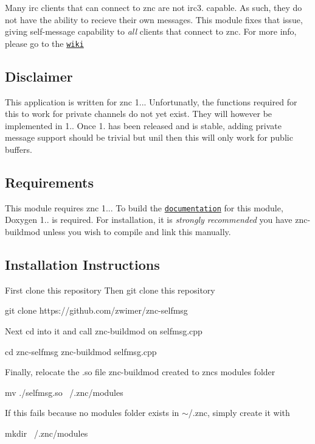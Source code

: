 Many irc clients that can connect to znc are not \textquotesingle{}irc3. capable\textquotesingle{}. As such, they do not have the ability to recieve their own messages. This module fixes that issue, giving self-\/message capability to {\itshape all} clients that connect to znc. For more info, please go to the \href{https://github.com/zwimer/znc-selfmsg/wiki}{\tt wiki}

\subsection*{Disclaimer}

This application is written for znc 1... Unfortunatly, the functions required for this to work for private channels do not yet exist. They will however be implemented in 1.. Once 1. has been released and is stable, adding private message support should be trivial but unil then this will only work for public buffers.

\subsection*{Requirements}

This module requires znc 1... To build the \href{#documentation}{\tt documentation} for this module, Doxygen 1.. is required. For installation, it is {\itshape strongly recommended} you have znc-\/buildmod unless you wish to compile and link this manually.

\subsection*{Installation Instructions}

First clone this repository Then git clone this repository 
\begin{DoxyCode}
git clone https://github.com/zwimer/znc-selfmsg
\end{DoxyCode}


Next cd into it and call znc-\/buildmod on selfmsg.\+cpp 
\begin{DoxyCode}
cd znc-selfmsg 
znc-buildmod selfmsg.cpp
\end{DoxyCode}


Finally, relocate the .so file znc-\/buildmod created to znc\textquotesingle{}s modules folder 
\begin{DoxyCode}
mv ./selfmsg.so ~/.znc/modules
\end{DoxyCode}


If this fails because no modules folder exists in $\sim$/.znc, simply create it with 
\begin{DoxyCode}
mkdir ~/.znc/modules
\end{DoxyCode}


